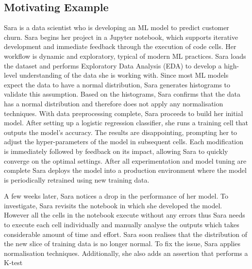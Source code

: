 
\subsection{Motivating Example}

Sara is a data scientist who is developing an ML model to predict customer churn. Sara begins her project in a Jupyter notebook, which supports iterative development and immediate feedback through the execution of code cells. Her workflow is dynamic and exploratory, typical of modern ML practices. Sara loads the dataset and performs Exploratory Data Analysis (EDA) to develop a high-level understanding of the data she is working with. Since most ML models expect the data to have a normal distribution, Sara generates histograms to validate this assumption. Based on the histograms, Sara confirms that the data has a normal distribution and therefore does not apply any normalisation techniques. With data preprocessing complete, Sara proceeds to build her initial model. After setting up a logistic regression classifier, she runs a training cell that outputs the model's accuracy. The results are disappointing, prompting her to adjust the hyper-parameters of the model in subsequent cells. Each modification is immediately followed by feedback on its impact, allowing Sara to quickly converge on the optimal settings. After all experimentation and model tuning are complete Sara deploys the model into a production environment where the model is periodically retrained using new training data.


A few weeks later, Sara notices a drop in the performance of her model. To investigate, Sara revisits the notebook in which she developed the model. However all the cells in the notebook execute without any errors thus Sara needs to execute each cell individually and manually analyse the outputs which takes considerable amount of time and effort. Sara soon realises that the distribution of the new slice of training data is no longer normal. To fix the issue, Sara applies normalisation techniques. Additionally, she also adds an assertion that performs a K-test 

